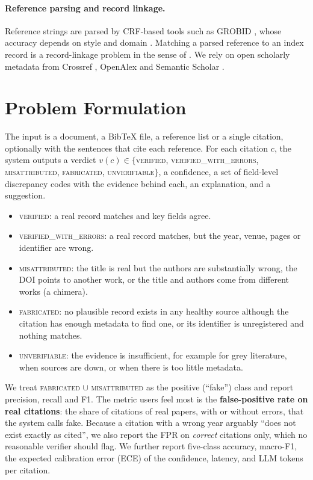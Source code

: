 \documentclass[10pt,twocolumn,a4paper]{article}
\newcommand{\verdict}[1]{\textsc{\MakeLowercase{#1}}}
\begin{document}
\paragraph{Reference parsing and record linkage.}
Reference strings are parsed by CRF-based tools such as GROBID \citep{lopez2009grobid}, whose
accuracy depends on style and domain \citep{tkaczyk2018machine}. Matching a parsed reference to an
index record is a record-linkage problem in the sense of \citet{fellegi1969theory}. We rely on open
scholarly metadata from Crossref \citep{hendricks2020crossref}, OpenAlex \citep{priem2022openalex}
and Semantic Scholar \citep{kinney2023semantic}.

\section{Problem Formulation}
\label{sec:problem}

The input is a document, a BibTeX file, a reference list or a single citation, optionally with the
sentences that cite each reference. For each citation $c$, the system outputs a verdict
$v(c)\in\{$\verdict{VERIFIED}, \verdict{VERIFIED\_WITH\_ERRORS}, \verdict{MISATTRIBUTED},
\verdict{FABRICATED}, \verdict{UNVERIFIABLE}$\}$, a confidence, a set of field-level discrepancy codes
with the evidence behind each, an explanation, and a suggestion.
\begin{itemize}
  \item \verdict{VERIFIED}: a real record matches and key fields agree.
  \item \verdict{VERIFIED\_WITH\_ERRORS}: a real record matches, but the year, venue, pages or
  identifier are wrong.
  \item \verdict{MISATTRIBUTED}: the title is real but the authors are substantially wrong, the DOI
  points to another work, or the title and authors come from different works (a chimera).
  \item \verdict{FABRICATED}: no plausible record exists in any healthy source although the citation
  has enough metadata to find one, or its identifier is unregistered and nothing matches.
  \item \verdict{UNVERIFIABLE}: the evidence is insufficient, for example for grey literature, when
  sources are down, or when there is too little metadata.
\end{itemize}

We treat \verdict{FABRICATED} $\cup$ \verdict{MISATTRIBUTED} as the positive (``fake'') class and
report precision, recall and F1. The metric users feel most is the \textbf{false-positive rate on
real citations}: the share of citations of real papers, with or without errors, that the system
calls fake. Because a citation with a wrong year arguably ``does not exist exactly as cited'', we
also report the FPR on \emph{correct} citations only, which no reasonable verifier should flag. We
further report five-class accuracy, macro-F1, the expected calibration error (ECE)
\citep{guo2017calibration} of the confidence, latency, and LLM tokens per citation.
\end{document}
